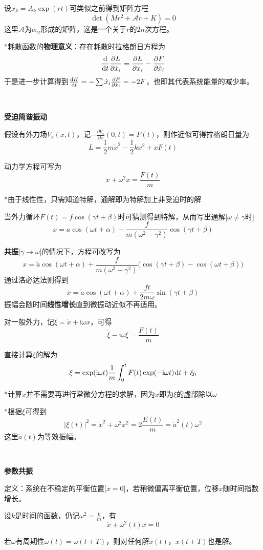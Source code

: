 \documentclass[a4paper,UTF8,fontset=windows]{ctexart}
\newcommand*{\dr}{\hspace{0.07em}\mathrm{d}}
\begin{document}
设$x_k=A_k\exp(rt)$可类似之前得到矩阵方程
$$\det(Mr^2+\mathcal{A}r+K)=0$$
这里$\mathcal{A}$为$\alpha_{ij}$形成的矩阵，这是一个关于$r$的$2n$次方程。

*耗散函数的\textbf{物理意义}：存在耗散时拉格朗日方程为
$$\frac{\dr}{\dr t}\frac{\partial L}{\partial\dot{x}_i}=\frac{\partial L}{\partial x_i}-\frac{\partial F}{\partial\dot{x}_i}$$
于是进一步计算得到$\frac{\dr H}{\dr t}=-\sum\dot{x}_i\frac{\partial F}{\partial\dot{x}_i}=-2F$，也即其代表系统能量的减少率。

\

\textbf{受迫简谐振动}

假设有外力场$V_e(x,t)$，记$-\frac{\partial V_e}{\partial x}(0,t)=F(t)$，则作近似可得拉格朗日量为
$$L=\frac{1}{2}m\dot{x}^2-\frac{1}{2}kx^2+xF(t)$$

动力学方程可写为
$$\ddot{x}+\omega^2x=\frac{F(t)}{m}$$

*由于线性性，只需知道特解，通解即为特解加上非受迫时的解

当外力循环$F(t)=f\cos(\gamma t+\beta)$时可猜测得到特解，从而写出通解[$\omega\ne\gamma$时]
$$x=a\cos(\omega t+\alpha)+\frac{f}{m(\omega^2-\gamma^2)}\cos(\gamma t+\beta)$$

\textbf{共振}[$\gamma\to\omega$]的情况下，方程可改写为
$$x=\tilde{a}\cos(\omega t+\alpha)+\frac{f}{m(\omega^2-\gamma^2)}\big(\cos(\gamma t+\beta)-\cos(\omega t+\beta)\big)$$
通过洛必达法则得到
$$x=\tilde{a}\cos(\omega t+\alpha)+\frac{ft}{2m\omega}\sin(\gamma t+\beta)$$
振幅会随时间\textbf{线性增长}直到微振动近似不再适用。

对一般外力，记$\xi=\dot{x}+\mathrm{i}\omega x$，可得$$\dot{\xi}-\mathrm{i}\omega\xi=\frac{F(t)}{m}$$

直接计算$\xi$的解为
$$\xi=\exp(\mathrm{i}\omega t)\frac{1}{m}\int_0^tF(t)\exp(-\mathrm{i}\omega t)\dr t+\xi_0$$

*计算$x$并不需要再进行常微分方程的求解，因为$x$即为$\xi$的虚部除以$\omega$

*根据$\xi$可得到
$$|\xi(t)|^2=\dot{x}^2+\omega^2x^2=2\frac{E(t)}{m}=\tilde{a}^2(t)\omega^2$$
这里$\tilde{a}(t)$为等效振幅。

\

\textbf{参数共振}

定义：系统在不稳定的平衡位置[$x=0$]，若稍微偏离平衡位置，位移$x$随时间指数增长。

设$k$是时间的函数，仍记$\omega^2=\frac{k}{m}$，有
$$\ddot{x}+\omega^2(t)x=0$$

若$\omega$有周期性$\omega(t)=\omega(t+T)$，则对任何解$x(t)$，$x(t+T)$也是解。
\end{document}
